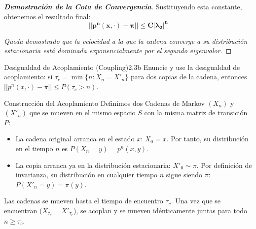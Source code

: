 \documentclass[10pt,a4paper]{article}
\begin{document}
\begin{proof}[\textbf{Demostración de la Cota de Convergencia}]
    Sustituyendo esta constante, obtenemos el resultado final:
    \[ \mathbf{||p^n(x, \cdot) - \pi|| \le C |\lambda_2|^n} \]
    
    \textit{Queda demostrado que la velocidad a la que la cadena converge a su distribución estacionaria está dominada exponencialmente por el segundo eigenvalor.}
\end{proof}

\newpage

\vspace{5mm}

\begin{ejercicio}{Desigualdad de Acoplamiento (Coupling)}{2.3b}
    Enuncie y use la desigualdad de acoplamiento: si $\tau_c = \min\{n : X_n = X'_n\}$ para dos copias de la cadena, entonces $||p^n(x, \cdot) - \pi|| \le P(\tau_c > n)$.
\end{ejercicio}

\vspace{2mm}

\begin{nota}{Construcción del Acoplamiento}
    Definimos dos Cadenas de Markov $(X_n)$ y $(X'_n)$ que se mueven en el mismo espacio $S$ con la misma matriz de transición $P$:
    \begin{itemize}
        \item La cadena original arranca en el estado $x$: $X_0 = x$. Por tanto, su distribución en el tiempo $n$ es $P(X_n = y) = p^n(x,y)$.
        \item La copia arranca ya en la distribución estacionaria: $X'_0 \sim \pi$. Por definición de invarianza, su distribución en cualquier tiempo $n$ sigue siendo $\pi$: $P(X'_n = y) = \pi(y)$.
    \end{itemize}
    Las cadenas se mueven hasta el tiempo de encuentro $\tau_c$. Una vez que se encuentran ($X_{\tau_c} = X'_{\tau_c}$), se acoplan y se mueven idénticamente juntas para todo $n \ge \tau_c$.
\end{nota}

\vspace{5mm}
\end{document}

